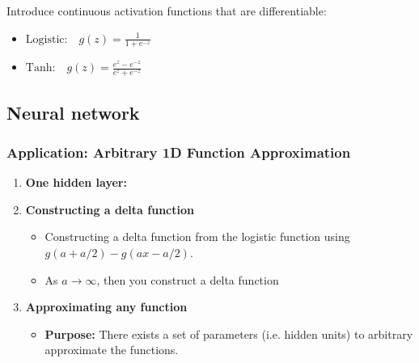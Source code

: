 \begin{definition}
    Introduce continuous activation functions that are differentiable: 
    \begin{itemize}
        \item $\text{Logistic:} \quad g(z) = \frac{1}{1 + e^{-z}}$
        \item $\text{Tanh:} \quad g(z) = \frac{e^z - e^{-z}}{e^z + e^{-z}}$
    \end{itemize}
\end{definition}

\subsection{Neural network}
\begin{example}
\end{example}

\subsubsection{Application: Arbitrary 1D Function Approximation}
\begin{example}
    \begin{enumerate}
        \item \textbf{One hidden layer:}
        \item \textbf{Constructing a delta function}
        \begin{itemize}
            \item Constructing a delta function from the logistic function using $g(a+a/2)-g(ax-a/2)$.
            \item As $a\rightarrow \infty$, then you construct a delta function 
        \end{itemize}

        \item \textbf{Approximating any function}
        \begin{itemize}
            \item \textbf{Purpose:} There exists a set of parameters (i.e. hidden units) to arbitrary approximate the functions.
        \end{itemize}
    \end{enumerate}
\end{example}